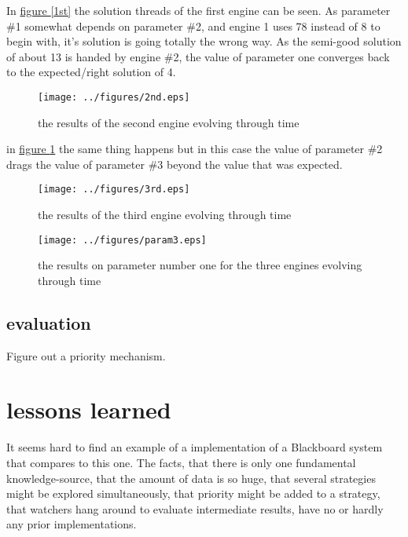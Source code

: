 \documentclass[]{lofar}
\begin{document}
      In \hyperlink{1st}{figure \ref{1st}} the solution threads of the
      first engine can be seen. As parameter \#1 somewhat depends on
      parameter \#2, and engine 1 uses 78 instead of 8 to begin with,
      it's solution is going totally the wrong way. As the semi-good
      solution of about 13 is handed by engine \#2, the value of
      parameter one converges back to the expected/right solution of 4.

      \begin{figure}
        \texttt{[image: ../figures/2nd.eps]}
        \hypertarget{2nd}{}%
        \caption{the results of the second engine evolving through time\label{2nd}}
      \end{figure}

      in \hyperlink{2nd}{figure \ref{2nd}} the same thing happens but
      in this case the value of parameter \#2 drags the value of
      parameter \#3 beyond the value that was expected.

      \begin{figure}
        \texttt{[image: ../figures/3rd.eps]}
        \hypertarget{3rd}{}%
        \caption{the results of the third engine evolving through time\label{3rd}}
      \end{figure}

      \begin{figure}
        \texttt{[image: ../figures/param3.eps]}
        \hypertarget{param3}{}%
        \caption{the results on parameter number one for the three engines evolving through time\label{param3}}
      \end{figure}

    \subsection{evaluation}
    \label{subsection-evaluation}\hypertarget{subsection-evaluation}{}%

      Figure out a priority mechanism.

  \section{lessons learned}

    It seems hard to find an example of a implementation of a
    Blackboard system that compares to this one. The facts, that there
    is only one fundamental knowledge-source, that the amount of data
    is so huge, that several strategies might be explored
    simultaneously, that priority might be added to a strategy, that
    watchers hang around to evaluate intermediate results, have no or
    hardly any prior implementations.
\end{document}
